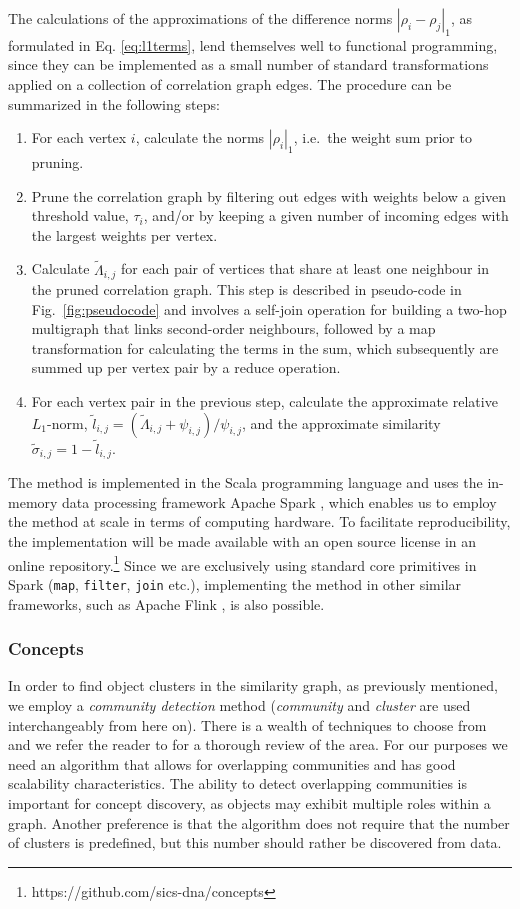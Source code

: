 \documentclass{kais}
\newcommand{\rn}[1]{\rho_{#1}}
\newcommand{\rns}[1]{|\rn{#1}|_1}
\newcommand{\mrn}[1]{\tau_{#1}}
\newcommand{\asy}[1]{\tilde{\sigma}_{#1}}
\newcommand{\dnm}[2]{|\rn{#1}-\rn{#2}|_1}
\begin{document}
The calculations of the approximations of the difference norms
$\dnm{i}{j}$, as formulated in Eq. \ref{eq:l1terms}, lend themselves well to functional
programming, since they can be implemented as a small number of standard transformations applied
on a collection of correlation graph edges. The procedure can be summarized in the following
steps:
\begin{enumerate}
\item For each vertex $i$, calculate the norms $\rns{i}$, i.e.~the weight sum prior
to pruning.
\item Prune the correlation graph by filtering out edges with weights below a given threshold value, $\mrn{i}$, and/or 
by keeping a given number of incoming edges with the largest weights per vertex.
\item Calculate $\tilde{\Lambda}_{i,j}$ for each pair of vertices that share at least one neighbour in the pruned correlation graph.
This step is described in pseudo-code in Fig.\ \ref{fig:pseudocode} and
involves a self-join operation for building a two-hop multigraph that links
second-order neighbours, followed by a map transformation for calculating the
terms in the sum, which subsequently are summed up per vertex pair by a reduce
operation.
\item For each vertex pair in the previous step, calculate the
approximate relative $L_1$-norm, $\tilde{l}_{i,j} =
(\tilde{\Lambda}_{i,j} + \psi_{i,j})/\psi_{i,j}$,
and  the approximate
similarity $\asy{i,j} = 1 - \tilde{l}_{i,j}$.
\end{enumerate}
The method is implemented in the Scala programming language and uses the in-memory
data processing framework Apache Spark \cite{Zaharia-2012}, which enables us
to employ the method at scale in terms of computing hardware.
To facilitate reproducibility, the implementation will be made available
with an open source license in an online repository.\footnote{https://github.com/sics-dna/concepts}
 Since we are exclusively using standard core primitives in Spark (\texttt{map},
\texttt{filter}, \texttt{join} etc.), implementing the
method in other similar frameworks, such as Apache Flink \cite{Alexandrov14}, is also
possible.

\subsubsection{Concepts}
\label{sec:slpa-implementation}
In order to find object clusters in the similarity graph, as previously mentioned, we employ a \emph{community detection} 
method (\emph{community} and \emph{cluster} are used interchangeably from here on). 
There is a wealth of techniques to choose from and we refer the reader to 
for a thorough review of the area. For our purposes we need an algorithm that allows for overlapping communities
and has good scalability characteristics. The ability to detect overlapping communities is important for
concept discovery, as objects may exhibit multiple roles within a graph. 
Another preference is that the algorithm does not require that the 
number of clusters is predefined, but this number should rather be discovered from data.
\end{document}
